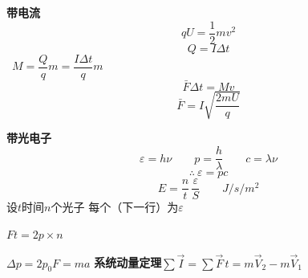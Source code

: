 \textbf{带电流}
\[
qU=\frac{1}{2}mv^{2}
\]
\[
Q=I\Delta t
\]
\ $M=\dfrac{Q}{q}m=\dfrac{I\Delta t}{q}m$
\[
\bar F\Delta t=Mv
\]
\[
\bar F=I\sqrt{\frac{2mU}{q}}
\]

\textbf{带光电子} %
\[
\varepsilon=h\nu\qquad p=\frac{h}{\lambda}\qquad c=\lambda\nu
\]
\[
\therefore\ \varepsilon=pc
\]
\[
E=\frac{n}{t}\,\frac{\varepsilon}{S}\qquad \unit{J/s/m^{2}}
\]
设$t$时间$n$个光子 每个（下一行）为$\varepsilon$ %

\quad $Ft=2p\times n$

$\Delta p=2p_0$\quad $F=ma$
\textbf{系统动量定理}\quad $\sum\vec I=\sum\vec F\,t=m\vec V_2-m\vec V_1$

